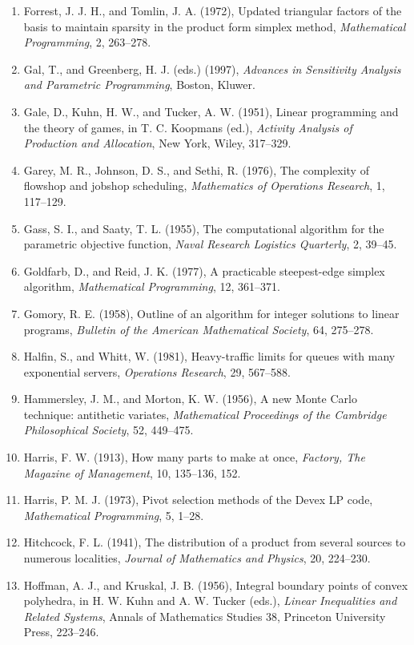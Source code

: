 \documentclass[11pt,a4paper]{article}
\numberwithin{equation}{section}
\theoremstyle{definition}
\begin{document}
\begin{enumerate}
\item Forrest, J. J. H., and Tomlin, J. A. (1972), Updated triangular factors of the basis to maintain sparsity in the product form simplex method, \emph{Mathematical Programming}, 2, 263--278.
\item Gal, T., and Greenberg, H. J. (eds.) (1997), \emph{Advances in Sensitivity Analysis and Parametric Programming}, Boston, Kluwer.
\item Gale, D., Kuhn, H. W., and Tucker, A. W. (1951), Linear programming and the theory of games, in T. C. Koopmans (ed.), \emph{Activity Analysis of Production and Allocation}, New York, Wiley, 317--329.
\item Garey, M. R., Johnson, D. S., and Sethi, R. (1976), The complexity of flowshop and jobshop scheduling, \emph{Mathematics of Operations Research}, 1, 117--129.
\item Gass, S. I., and Saaty, T. L. (1955), The computational algorithm for the parametric objective function, \emph{Naval Research Logistics Quarterly}, 2, 39--45.
\item Goldfarb, D., and Reid, J. K. (1977), A practicable steepest-edge simplex algorithm, \emph{Mathematical Programming}, 12, 361--371.
\item Gomory, R. E. (1958), Outline of an algorithm for integer solutions to linear programs, \emph{Bulletin of the American Mathematical Society}, 64, 275--278.
\item Halfin, S., and Whitt, W. (1981), Heavy-traffic limits for queues with many exponential servers, \emph{Operations Research}, 29, 567--588.
\item Hammersley, J. M., and Morton, K. W. (1956), A new Monte Carlo technique: antithetic variates, \emph{Mathematical Proceedings of the Cambridge Philosophical Society}, 52, 449--475.
\item Harris, F. W. (1913), How many parts to make at once, \emph{Factory, The Magazine of Management}, 10, 135--136, 152.
\item Harris, P. M. J. (1973), Pivot selection methods of the Devex LP code, \emph{Mathematical Programming}, 5, 1--28.
\item Hitchcock, F. L. (1941), The distribution of a product from several sources to numerous localities, \emph{Journal of Mathematics and Physics}, 20, 224--230.
\item Hoffman, A. J., and Kruskal, J. B. (1956), Integral boundary points of convex polyhedra, in H. W. Kuhn and A. W. Tucker (eds.), \emph{Linear Inequalities and Related Systems}, Annals of Mathematics Studies 38, Princeton University Press, 223--246.

\end{enumerate}
\end{document}
